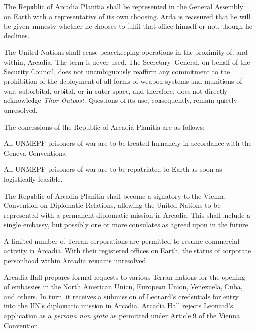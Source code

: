 \item The Republic of Arcadia Planitia shall be represented in the General Assembly on Earth with a representative of its own choosing. Arda is reassured that he will be given amnesty whether he chooses to fulfil that office himself or not, though he declines.

\item The United Nations shall cease peacekeeping operations in the proximity of, and within, Arcadia. The term  is never used. The Secretary--General, on behalf of the Security Council, does not unambiguously reaffirm any commitment to the prohibition of the deployment of all forms of weapon systems and munitions of war, suborbital, orbital, or in outer space, and therefore, does not directly acknowledge {\it Thor Outpost}. Questions of its use, consequently, remain quietly unresolved.
\stopitemize

The concessions of the Republic of Arcadia Planitia are as follows:

\startitemize[R]
\item All UNMEPF prisoners of war are to be treated humanely in accordance with the Geneva Conventions.

\item All UNMEPF prisoners of war are to be repatriated to Earth as soon as logistically feasible.

\item The Republic of Arcadia Planitia shall become a signatory to the Vienna Convention on Diplomatic Relations, allowing the United Nations to be represented with a permanent diplomatic mission in Arcadia. This shall include a single embassy, but possibly one or more consulates as agreed upon in the future.

\item A limited number of Terran corporations are permitted to resume commercial activity in Arcadia. With their registered offices on Earth, the status of corporate personhood within Arcadia remains unresolved.
\stopitemize

Arcadia Hall prepares formal requests to various Terran nations for the opening of embassies in the North American Union, European Union, Venezuela, Cuba, and others. In turn, it receives a submission of Leonard's credentials for entry into the UN's diplomatic mission in Arcadia. Arcadia Hall rejects Leonard's application as a {\it persona non grata} as permitted under Article 9 of the Vienna Convention.
\StopTimelineDate

